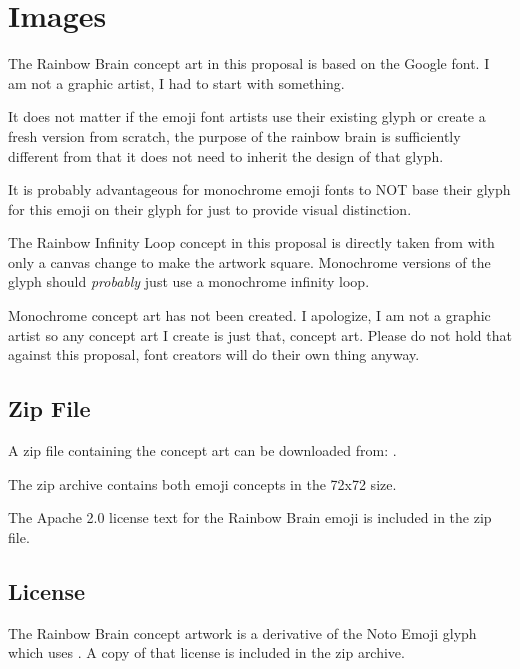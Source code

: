 \section{Images}

The Rainbow Brain concept art in this proposal is based on the Google\textsuperscript{\textregistered}
 font. I am not a
graphic artist, I had to start with something.

It does not matter if the emoji font artists use their existing \brainemoji{} glyph
or create a fresh version from scratch, the purpose of the rainbow brain is
sufficiently different from \brainemoji{} that it does not need to inherit the
design of that glyph.

It is probably advantageous for monochrome emoji fonts to NOT base their glyph for
this emoji on their glyph for \brainemoji{} just to provide visual distinction.

The Rainbow Infinity Loop concept in this proposal is directly taken from
with only a canvas change to make the artwork square. Monochrome versions of the glyph
should \emph{probably} just use a monochrome infinity loop.

Monochrome concept art has not been created. I apologize, I am not a graphic artist
so any concept art I create is just that, concept art. Please do not hold that against
this proposal, font creators will do their own thing anyway.

\subsection{Zip File}
A zip file containing the concept art can be downloaded from:
.

The zip archive contains both emoji concepts in the 72x72 size.

The Apache 2.0 license text for the Rainbow Brain emoji is included in the zip file.

\subsection{License}

The Rainbow Brain concept artwork is a derivative of the Noto Emoji \brainemoji{} glyph
which uses .
A copy of that license is included in the zip archive.

